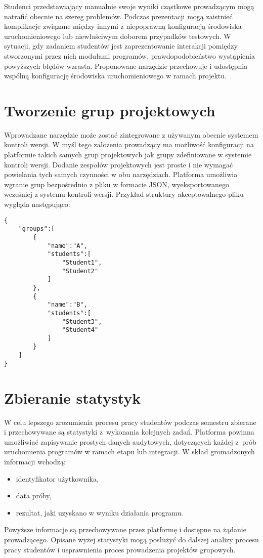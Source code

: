 Studenci przedstawiający manualnie swoje wyniki cząstkowe prowadzącym mogą natrafić obecnie na szereg problemów.
Podczas prezentacji mogą zaistnieć komplikacje związane między innymi z niepoprawną konfiguracją środowiska uruchomieniowego lub niewłaściwym doborem przypadków testowych.
W sytuacji, gdy zadaniem studentów jest zaprezentowanie interakcji pomiędzy stworzonymi przez nich modułami programów, prawdopodobieństwo wystąpienia powyższych błędów wzrasta.
Proponowane narzędzie przechowuje i udostępnia wspólną konfigurację środowiska uruchomieniowego w ramach projektu.


\section{Tworzenie grup projektowych}

Wprowadzane narzędzie może zostać zintegrowane z używanym obecnie systemem kontroli wersji.
W myśl tego założenia prowadzący ma możliwość konfiguracji na platformie takich samych grup projektowych jak grupy zdefiniowane w systemie kontroli wersji.
Dodanie zespołów projektowych jest proste i nie wymagać powielania tych samych czynności w obu narzędziach.
Platforma umożliwia wgranie grup bezpośrednio z pliku w formacie JSON, wyeksportowanego wcześniej z systemu kontroli wersji.
Przykład struktury akceptowalnego pliku wygląda następująco:

{\selectfont
\footnotesize
\begin{lstlisting}
{
    "groups":[
        {
            "name":"A",
            "students":[
                "Student1",
                "Student2"
            ]
        },
        {
            "name":"B",
            "students":[
                "Student3",
                "Student4"
            ]
        }
    ]
}
\end{lstlisting}
}


\section{Zbieranie statystyk}

W celu lepszego zrozumienia procesu pracy studentów podczas semestru zbierane i przechowywane są statystyki z~wykonania kolejnych zadań.
Platforma powinna umożliwiać zapisywanie prostych danych audytowych, dotyczących każdej z~prób uruchomienia programów w ramach etapu lub integracji.
W skład gromadzonych informacji wchodzą:
\begin{itemize}
    \item identyfikator użytkownika,
    \item data próby,
    \item rezultat, jaki uzyskano w wyniku działania programu.
\end{itemize}
Powyższe informacje są przechowywane przez platformę i dostępne na żądanie prowadzącego.
Opisane wyżej statystyki mogą posłużyć do dalszej analizy procesu pracy studentów i usprawnienia proces prowadzenia projektów grupowych.


